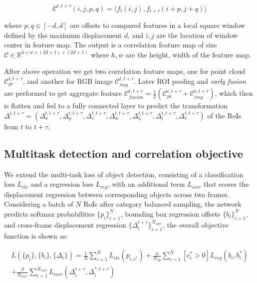 \documentclass{bmvc2k}
\begin{document}
\vspace{-0.5cm}
\begin{equation}
\mathcal{C}^{t, t+\tau}(i, j, p, q) = \Big \langle f_t(i, j), f_{t+\tau} (i+p, j+q) \Big \rangle 
\end{equation}
\vspace{-0.5cm}

where $p, q \in [-d, d]$ are offsets to compared features in a local square window defined by the maximum displacement $d$, and $i, j$ are the location of window center in feature map. The output is a correlation feature map of size $\mathcal{C} \in \mathbb{R}^{h \times w \times (2d+1) \times (2d+1)}$ where $h, w$ are the height, width of the feature map.

After above operation we get two correlation feature maps, one for point cloud $\mathcal{C}^{t, t+\tau}_{pc}$, and another for RGB image $\mathcal{C}^{t, t+\tau}_{img}$. Later ROI pooling and \textit{early fusion} are performed to get aggregate feature $\mathcal{C}^{t,t+\tau}_{fusion} = \frac{1}{2}(\mathcal{C}^{t, t+\tau}_{pc} + \mathcal{C}^{t, t+\tau}_{img})$, which then is flatten and fed to a fully connected layer to predict the transformation
$\Delta^{t, t+\tau} = (\Delta^{t,t+\tau}_{x}, \Delta^{t,t+\tau}_{y}, \Delta^{t,t+\tau}_{z}, \Delta^{t,t+\tau}_{w},  \Delta^{t,t+\tau}_{h},  \Delta^{t,t+\tau}_{l}, \Delta^{t,t+\tau}_{r})$ of the RoIs from $t$ to $t+\tau$. 

\subsection{Multitask detection and correlation objective}
We extend the multi-task loss of object detection, consisting of a classification loss $L_{cls}$ and a regression loss $L_{reg}$, with an additional term $L_{corr}$ that scores the displacement regression between corresponding objects across two frames. Considering a batch of $N$ RoIs after category balanced sampling, the network predicts softmax probabilities $\{p_i\}^N_{i=1}$, bounding box regression offsets $\{b_i\}^N_{i=1}$, and cross-frame displacement regression $\{\Delta^{t+\tau}_i\}^{N_{corr}}_{i=1}$, the overall objective function is shown as:

\vspace{-0.5cm}
\begin{equation}
\begin{split}
L(\{p_i\}, \{b_i\}, \{\Delta_i\}) = \frac{1}{N} \sum^N_{i=1} L_{cls}(p_{i, c^*}) 
+ \frac{\alpha}{N_{fg}}\sum^N_{i=1} [c^*_i > 0]L_{reg}(b_i, b^*_i) \\
+ \frac{\beta}{N_{corr}} \sum^{N_{corr}}_{i=1}L_{corr}(\Delta^{t+\tau}_i, \Delta^{*, t+\tau}_i)
\end{split}
\end{equation}
\vspace{-0.3cm}
\end{document}
